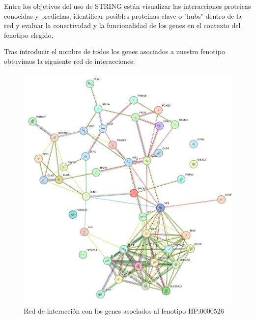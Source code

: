 Entre los objetivos del uso de STRING están visualizar las interacciones proteicas conocidas y predichas, identificar posibles proteínas clave o "hubs" dentro de la red y evaluar la conectividad y la funcionalidad de los genes en el contexto del fenotipo elegido.
	
Tras introducir el nombre de todos los genes asociados a nuestro fenotipo obtuvimos la siguiente red de interacciones:

\newpage

\begin{figure}[h] %
	\centering
	\includegraphics[width=1\textwidth]{figures/red_interaccion_aniridia.png} %
	\caption{Red de interacción con los genes asociados al fenotipo HP:0000526} %
	\label{fig:mi-imagen} %
\end{figure}


